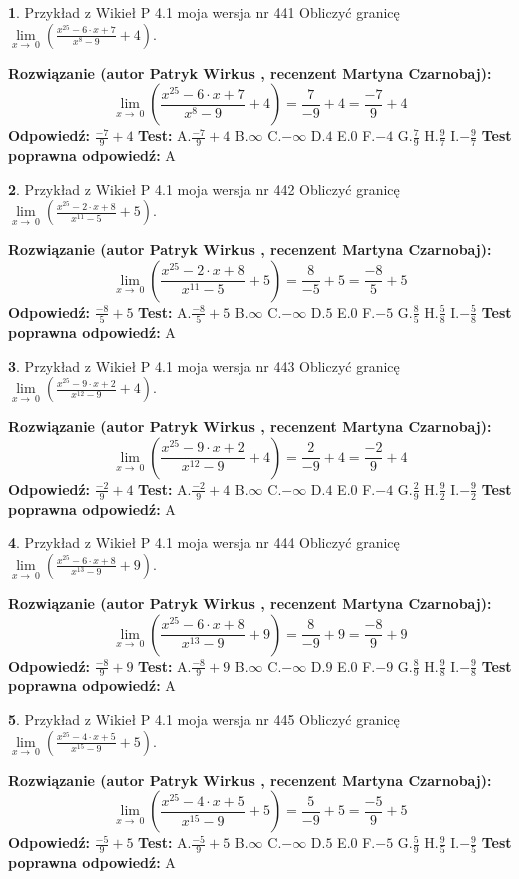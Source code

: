 \documentclass[12pt, a4paper]{article}
\theoremstyle{definition} %
\newtheorem{zad}{}
\newcommand{\zadStart}[1]{\begin{zad}#1\newline}
\newcommand{\zadStop}{\end{zad}}
\newcommand{\rozwStart}[2]{\noindent \textbf{Rozwiązanie (autor #1 , recenzent #2): }\newline}
\newcommand{\rozwStop}{\newline}
\newcommand{\odpStart}{\noindent \textbf{Odpowiedź:}\newline}
\newcommand{\odpStop}{\newline}
\newcommand{\testStart}{\noindent \textbf{Test:}\newline}
\newcommand{\testStop}{\newline}
\newcommand{\kluczStart}{\noindent \textbf{Test poprawna odpowiedź:}\newline}
\newcommand{\kluczStop}{\newline}
\begin{document}
\zadStart{Przykład z Wikieł P 4.1 moja wersja nr 441}
Obliczyć granicę $\lim\limits_{x\to\ 0}(\frac{x^{25}-6 \cdot x +7}{x^{8}-9}+4)$.
\zadStop
\rozwStart{Patryk Wirkus}{Martyna Czarnobaj}
$$\lim\limits_{x\to\ 0}(\frac{x^{25}-6 \cdot x +7}{x^{8}-9}+4)=\frac{7}{-9}+4=\frac{-7}{9}+4$$
\rozwStop
\odpStart
$\frac{-7}{9}+4$
\odpStop
\testStart
A.$\frac{-7}{9}+4$
B.$\infty$
C.$-\infty$
D.$4$
E.$0$
F.$-4$
G.$\frac{7}{9}$
H.$\frac{9}{7}$
I.$-\frac{9}{7}$
\testStop
\kluczStart
A
\kluczStop



\zadStart{Przykład z Wikieł P 4.1 moja wersja nr 442}
Obliczyć granicę $\lim\limits_{x\to\ 0}(\frac{x^{25}-2 \cdot x +8}{x^{11}-5}+5)$.
\zadStop
\rozwStart{Patryk Wirkus}{Martyna Czarnobaj}
$$\lim\limits_{x\to\ 0}(\frac{x^{25}-2 \cdot x +8}{x^{11}-5}+5)=\frac{8}{-5}+5=\frac{-8}{5}+5$$
\rozwStop
\odpStart
$\frac{-8}{5}+5$
\odpStop
\testStart
A.$\frac{-8}{5}+5$
B.$\infty$
C.$-\infty$
D.$5$
E.$0$
F.$-5$
G.$\frac{8}{5}$
H.$\frac{5}{8}$
I.$-\frac{5}{8}$
\testStop
\kluczStart
A
\kluczStop



\zadStart{Przykład z Wikieł P 4.1 moja wersja nr 443}
Obliczyć granicę $\lim\limits_{x\to\ 0}(\frac{x^{25}-9 \cdot x +2}{x^{12}-9}+4)$.
\zadStop
\rozwStart{Patryk Wirkus}{Martyna Czarnobaj}
$$\lim\limits_{x\to\ 0}(\frac{x^{25}-9 \cdot x +2}{x^{12}-9}+4)=\frac{2}{-9}+4=\frac{-2}{9}+4$$
\rozwStop
\odpStart
$\frac{-2}{9}+4$
\odpStop
\testStart
A.$\frac{-2}{9}+4$
B.$\infty$
C.$-\infty$
D.$4$
E.$0$
F.$-4$
G.$\frac{2}{9}$
H.$\frac{9}{2}$
I.$-\frac{9}{2}$
\testStop
\kluczStart
A
\kluczStop



\zadStart{Przykład z Wikieł P 4.1 moja wersja nr 444}
Obliczyć granicę $\lim\limits_{x\to\ 0}(\frac{x^{25}-6 \cdot x +8}{x^{13}-9}+9)$.
\zadStop
\rozwStart{Patryk Wirkus}{Martyna Czarnobaj}
$$\lim\limits_{x\to\ 0}(\frac{x^{25}-6 \cdot x +8}{x^{13}-9}+9)=\frac{8}{-9}+9=\frac{-8}{9}+9$$
\rozwStop
\odpStart
$\frac{-8}{9}+9$
\odpStop
\testStart
A.$\frac{-8}{9}+9$
B.$\infty$
C.$-\infty$
D.$9$
E.$0$
F.$-9$
G.$\frac{8}{9}$
H.$\frac{9}{8}$
I.$-\frac{9}{8}$
\testStop
\kluczStart
A
\kluczStop



\zadStart{Przykład z Wikieł P 4.1 moja wersja nr 445}
Obliczyć granicę $\lim\limits_{x\to\ 0}(\frac{x^{25}-4 \cdot x +5}{x^{15}-9}+5)$.
\zadStop
\rozwStart{Patryk Wirkus}{Martyna Czarnobaj}
$$\lim\limits_{x\to\ 0}(\frac{x^{25}-4 \cdot x +5}{x^{15}-9}+5)=\frac{5}{-9}+5=\frac{-5}{9}+5$$
\rozwStop
\odpStart
$\frac{-5}{9}+5$
\odpStop
\testStart
A.$\frac{-5}{9}+5$
B.$\infty$
C.$-\infty$
D.$5$
E.$0$
F.$-5$
G.$\frac{5}{9}$
H.$\frac{9}{5}$
I.$-\frac{9}{5}$
\testStop
\kluczStart
A
\kluczStop
\end{document}
